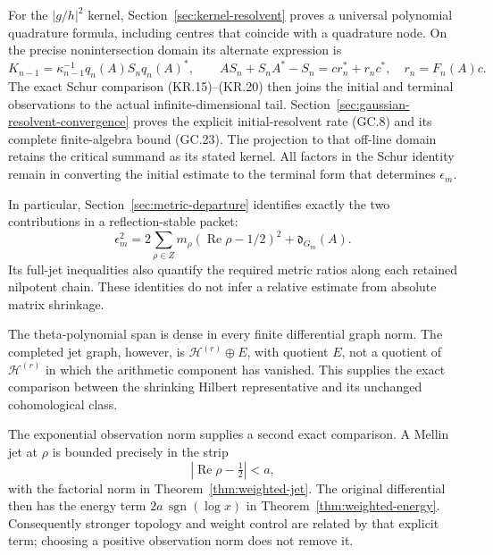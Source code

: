 For the \(|g/h|^2\) kernel, Section~\ref{sec:kernel-resolvent}
proves a universal polynomial quadrature formula, including
centres that coincide with a quadrature node. On the precise
nonintersection domain its alternate expression is
\[
 K_{n-1}=\kappa_{n-1}^{-1}q_n(A)S_nq_n(A)^*,\qquad
 AS_n+S_nA^*-S_n=cr_n^*+r_nc^*,\quad r_n=F_n(A)c.
\]
The exact Schur comparison (KR.15)--(KR.20) then joins the initial
and terminal observations to the actual infinite-dimensional tail.
Section~\ref{sec:gaussian-resolvent-convergence} proves the explicit
initial-resolvent rate (GC.8) and its complete finite-algebra
bound (GC.23). The projection to that off-line domain retains
the critical summand as its stated kernel. All factors in the
Schur identity remain in converting the initial estimate to the
terminal form that determines \(\epsilon_m\).

In particular, Section~\ref{sec:metric-departure} identifies
exactly the two contributions in a reflection-stable packet:
\[
 \epsilon_m^2=2\sum_{\rho\in Z}m_\rho
       (\operatorname{Re}\rho-1/2)^2+\mathfrak d_{G_m}(A).
\]
Its full-jet inequalities also quantify the required metric
ratios along each retained nilpotent chain. These identities
do not infer a relative estimate from absolute matrix shrinkage.

The theta-polynomial span is dense in every finite differential
graph norm. The completed jet graph, however, is
\(\mathscr H^{(r)}\oplus E\), with quotient \(E\), not a
quotient of \(\mathscr H^{(r)}\) in which the arithmetic
component has vanished. This supplies the exact comparison
between the shrinking Hilbert representative and its unchanged
cohomological class.

The exponential observation norm supplies a second exact
comparison. A Mellin jet at \(\rho\) is bounded precisely in
the strip
\[
 |\operatorname{Re}\rho-\tfrac12|<a,
\]
with the factorial norm in Theorem~\ref{thm:weighted-jet}.
The original differential then has the energy term
\(2a\,\operatorname{sgn}(\log x)\) in
Theorem~\ref{thm:weighted-energy}.
Consequently stronger topology and weight control are related
by that explicit term; choosing a positive observation norm
does not remove it.

